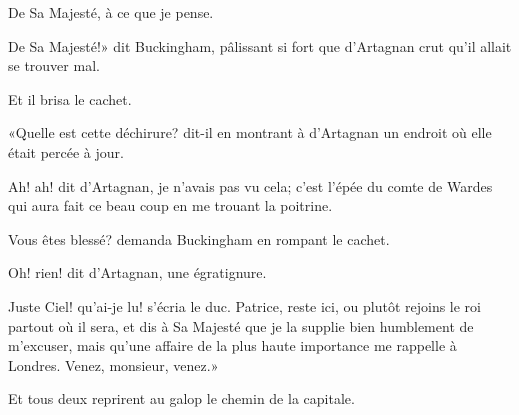 \speak  De Sa Majesté, à ce que je pense. 

\speak  De Sa Majesté!» dit Buckingham, pâlissant si fort que d'Artagnan crut qu'il allait se trouver mal. 

Et il brisa le cachet. 

«Quelle est cette déchirure? dit-il en montrant à d'Artagnan un endroit où elle était percée à jour. 

\speak  Ah! ah! dit d'Artagnan, je n'avais pas vu cela; c'est l'épée du comte de Wardes qui aura fait ce beau coup en me trouant la poitrine. 

\speak  Vous êtes blessé? demanda Buckingham en rompant le cachet. 

\speak  Oh! rien! dit d'Artagnan, une égratignure. 

\speak  Juste Ciel! qu'ai-je lu! s'écria le duc. Patrice, reste ici, ou plutôt rejoins le roi partout où il sera, et dis à Sa Majesté que je la supplie bien humblement de m'excuser, mais qu'une affaire de la plus haute importance me rappelle à Londres. Venez, monsieur, venez.» 

Et tous deux reprirent au galop le chemin de la capitale.